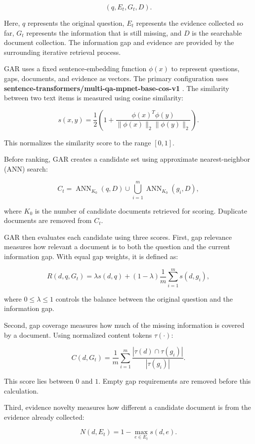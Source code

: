 \documentclass[12pt,a4paper]{report}
\begin{document}
\[
(q,E_t,G_t,D).
\]

Here, $q$ represents the original question, $E_t$ represents the evidence collected so far, $G_t$ represents the information that is still missing, and $D$ is the searchable document collection. The information gap and evidence are provided by the surrounding iterative retrieval process.

GAR uses a fixed sentence-embedding function $\phi(x)$ to represent questions, gaps, documents, and evidence as vectors. The primary configuration uses \textbf{sentence-transformers/multi-qa-mpnet-base-cos-v1} \cite{reimers2019sentence,st2020mpnet}. The similarity between two text items is measured using cosine similarity:

\[
s(x,y)=
\frac{1}{2}
\left(
1+
\frac{\phi(x)^T\phi(y)}
{\|\phi(x)\|_2\|\phi(y)\|_2}
\right).
\]

This normalizes the similarity score to the range $[0,1]$.

Before ranking, GAR creates a candidate set using approximate nearest-neighbor (ANN) search:

\[
C_t =
\operatorname{ANN}_{K_0}(q,D)
\cup
\bigcup_{i=1}^{m}
\operatorname{ANN}_{K_0}(g_i,D),
\]

where $K_0$ is the number of candidate documents retrieved for scoring. Duplicate documents are removed from $C_t$.

GAR then evaluates each candidate using three scores. First, gap relevance measures how relevant a document is to both the question and the current information gap. With equal gap weights, it is defined as:

\[
R(d,q,G_t)
=
\lambda s(d,q)
+
(1-\lambda)
\frac{1}{m}
\sum_{i=1}^{m}s(d,g_i),
\]

where $0\leq\lambda\leq1$ controls the balance between the original question and the information gap.

Second, gap coverage measures how much of the missing information is covered by a document. Using normalized content tokens $\tau(\cdot)$:

\[
C(d,G_t)
=
\frac{1}{m}
\sum_{i=1}^{m}
\frac{|\tau(d)\cap\tau(g_i)|}
{|\tau(g_i)|}.
\]

This score lies between $0$ and $1$. Empty gap requirements are removed before this calculation.

Third, evidence novelty measures how different a candidate document is from the evidence already collected:

\[
N(d,E_t)
=
1-\max_{e\in E_t}s(d,e).
\]
\end{document}
